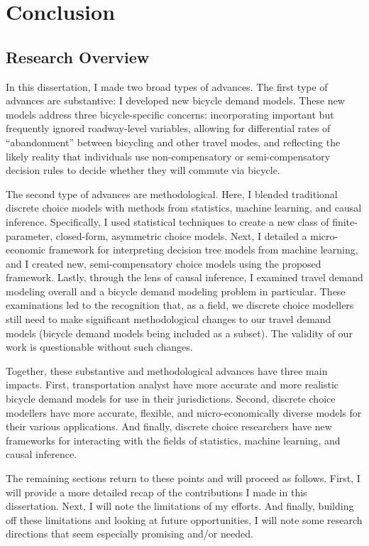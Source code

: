 
\chapter{Conclusion}
\label{ch:6}

\section{Research Overview}
In this dissertation, I made two broad types of advances. The first type of advances are substantive: I developed new bicycle demand models. These new models address three bicycle-specific concerns: incorporating important but frequently ignored roadway-level variables, allowing for differential rates of ``abandonment'' between bicycling and other travel modes, and reflecting the likely reality that individuals use non-compensatory or semi-compensatory decision rules to decide whether they will commute via bicycle.

The second type of advances are methodological. Here, I blended traditional discrete choice models with methods from statistics, machine learning, and causal inference. Specifically, I used statistical techniques to create a new class of finite-parameter, closed-form, asymmetric choice models. Next, I detailed a micro-economic framework for interpreting decision tree models from machine learning, and I created new, semi-compensatory choice models using the proposed framework. Lastly, through the lens of causal inference, I examined travel demand modeling overall and a bicycle demand modeling problem in particular. These examinations led to the recognition that, as a field, we discrete choice modellers still need to make significant methodological changes to our travel demand models (bicycle demand models being included as a subset). The validity of our work is questionable without such changes.

Together, these substantive and methodological advances have three main impacts. First, transportation analyst have more accurate and more realistic bicycle demand models for use in their jurisdictions. Second, discrete choice modellers have more accurate, flexible, and micro-economically diverse models for their various applications. And finally, discrete choice researchers have new frameworks for interacting with the fields of statistics, machine learning, and causal inference.

The remaining sections return to these points and will proceed as follows. First, I will provide a more detailed recap of the contributions I made in this dissertation. Next, I will note the limitations of my efforts. And finally, building off these limitations and looking at future opportunities, I will note some research directions that seem especially promising and/or needed.

